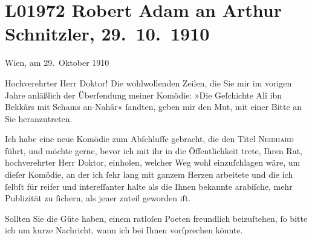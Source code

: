 

\section[Robert Adam an Arthur Schnitzler, 29. 10. 1910]{L01972 Robert Adam an Arthur Schnitzler, 29. 10. 1910}
\nopagebreak{}
\rehead{ }\normalsize\beginnumbering{}
\toendnotes[C]{\smallbreak\pagebreak[2]}
\toendnotes[C]{\smallbreak}
\pstart
           \raggedleft{}{\pb}Wien, am 29. Oktober 1910\pend
           
\pstart{}Hochverehrter Herr Doktor!\pend\vspace{0.5em}
\pstart
           Die wohlwollenden Zeilen, die Sie mir im vorigen Jahre anläßlich der Überſendung
               meiner Komödie: »Die Geſchichte Alî ibn Bekkârs mit
                  Schams an-Nahâr« ſandten, geben mir den Mut, mit einer Bitte an Sie
               heranzutreten.\pend
           
\pstart
           Ich habe eine neue Komödie zum Abſchluſſe gebracht, die den Titel \textsc{Neidhard} führt, und möchte gerne, bevor ich mit ihr in die Öffentlichkeit trete, {\pb}Ihren Rat, hochverehrter Herr Doktor, einholen,
               welcher Weg wohl einzuſchlagen wäre, um dieſer Komödie, an der ich ſehr lang mit
               ganzem Herzen arbeitete und die ich ſelbſt für reifer und intereſſanter halte als die
               Ihnen bekannte arabiſche, mehr
               Publizität zu ſichern, als jener zuteil geworden iſt.\pend
           
\pstart
           Sollten Sie die Güte haben, einem ratloſen Poeten freundlich beizuſtehen, ſo bitte
               ich um kurze Nachricht, wann ich bei Ihnen vorſprechen könnte.\pend
           
